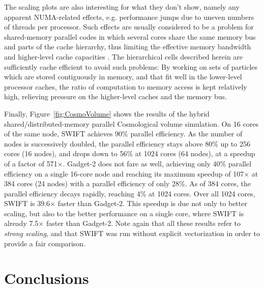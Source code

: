 \documentclass[final]{siamltex}
\newcommand{\fig}[1]
    {Figure~\ref{fig:#1}}
\begin{document}
The scaling plots are also interesting for what they don't show, namely
any apparent NUMA-related effects, e.g. performance jumps due to
uneven numbers of threads per processor.
Such effects are usually
considered to be a problem for shared-memory parallel codes in
which several cores share the same memory bus and parts of
the cache hierarchy, thus limiting the effective memory bandwidth
and higher-level cache capacities \cite{ref:Thacker2006}.
The hierarchical cells described herein are sufficiently
cache efficient to avoid such problems: By working on sets
of particles which are stored contiguously in memory,
and that fit well in the lower-level processor caches, the ratio
of computation to memory access is kept relatively high, relieving
pressure on the higher-level caches and the memory bus.

Finally, \fig{CosmoVolume} shows the results of the hybrid
shared/distributed-memory parallel Cosmological volume simulation.
On 16 cores of the same node, SWIFT achieves 90\% parallel efficiency.
As the number of nodes is successively doubled, the parallel
efficiency stays above 80\% up to 256 cores (16 nodes), and
drops down to 56\% at 1024 cores (64 nodes), at a speedup
of a factor of 571$\times$.
Gadget-2 does not fare as well, achieving only 40\% parallel efficiency
on a single 16-core node and reaching its maximum speedup of 107$\times$ at
384 cores (24 nodes) with a parallel efficiency of only 28\%.
As of 384 cores, the parallel efficiency decays rapidly, reaching
4\% at 1024 cores.
Over all 1024 cores, SWIFT is 39.6$\times$ faster than Gadget-2.
This speedup is due not only to better scaling, but also to
the better performance on a single core, where SWIFT is already
7.5$\times$ faster than Gadget-2.
Note again that all these results refer to {\em strong scaling},
and that SWIFT was run without explicit vectorization in order
to provide a fair comparison.


% 
%         


\section{Conclusions}
\end{document}
